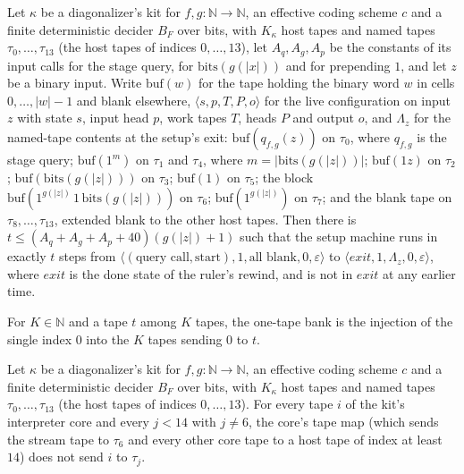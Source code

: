 \begin{theorem}
Let $\kappa$ be a diagonalizer's kit for $f, g : \mathbb{N} \to \mathbb{N}$, an effective coding scheme $c$ and a finite deterministic decider $B_F$ over bits, with $K_\kappa$ host tapes and named tapes $\tau_0, \dots, \tau_{13}$ (the host tapes of indices $0, \dots, 13$), let $A_q, A_g, A_p$ be the constants of its input calls for the stage query, for $\mathrm{bits}(g(|x|))$ and for prepending $1$, and let $z$ be a binary input. Write $\mathrm{buf}(w)$ for the tape holding the binary word $w$ in cells $0, \dots, |w| - 1$ and blank elsewhere, $\langle s, p, T, P, o\rangle$ for the live configuration on input $z$ with state $s$, input head $p$, work tapes $T$, heads $P$ and output $o$, and $\Lambda_z$ for the named-tape contents at the setup's exit: $\mathrm{buf}(q_{f,g}(z))$ on $\tau_0$, where $q_{f,g}$ is the stage query; $\mathrm{buf}(1^m)$ on $\tau_1$ and $\tau_4$, where $m = |\mathrm{bits}(g(|z|))|$; $\mathrm{buf}(1z)$ on $\tau_2$; $\mathrm{buf}(\mathrm{bits}(g(|z|)))$ on $\tau_3$; $\mathrm{buf}(1)$ on $\tau_5$; the block $\mathrm{buf}(1^{g(|z|)}\,1\,\mathrm{bits}(g(|z|)))$ on $\tau_6$; $\mathrm{buf}(1^{g(|z|)})$ on $\tau_7$; and the blank tape on $\tau_8, \dots, \tau_{13}$, extended blank to the other host tapes. Then there is $t \le (A_q + A_g + A_p + 40)(g(|z|) + 1)$ such that the setup machine runs in exactly $t$ steps from $\langle (\text{query call}, \text{start}), 1, \text{all blank}, 0, \varepsilon\rangle$ to $\langle \mathit{exit}, 1, \Lambda_z, 0, \varepsilon\rangle$, where $\mathit{exit}$ is the done state of the ruler's rewind, and is not in $\mathit{exit}$ at any earlier time.
\end{theorem}

\begin{definition}
\label{Turing.NTimeDiag.dzOne}
\leanok
For $K \in \mathbb{N}$ and a tape $t$ among $K$ tapes, the one-tape bank is the injection of the single index $0$ into the $K$ tapes sending $0$ to $t$.
\end{definition}

\begin{theorem}
\label{Turing.NTimeDiag.DzKit.bR_ne}
\leanok
{}
Let $\kappa$ be a diagonalizer's kit for $f, g : \mathbb{N} \to \mathbb{N}$, an effective coding scheme $c$ and a finite deterministic decider $B_F$ over bits, with $K_\kappa$ host tapes and named tapes $\tau_0, \dots, \tau_{13}$ (the host tapes of indices $0, \dots, 13$). For every tape $i$ of the kit's interpreter core and every $j < 14$ with $j \ne 6$, the core's tape map (which sends the stream tape to $\tau_6$ and every other core tape to a host tape of index at least $14$) does not send $i$ to $\tau_j$.
\end{theorem}

